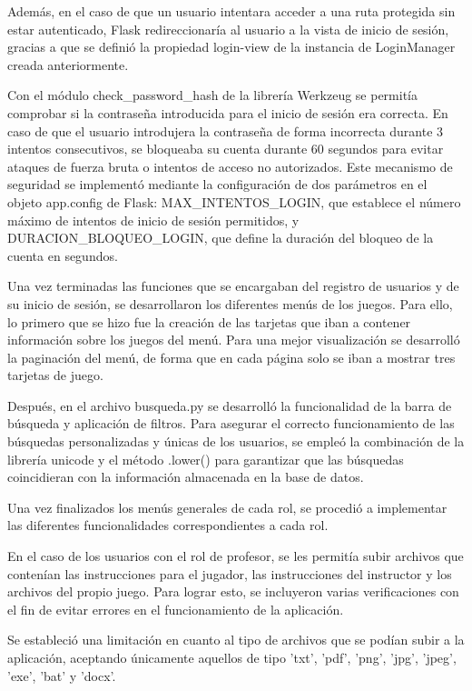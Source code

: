 Además, en el caso de que un usuario intentara acceder a una ruta protegida sin estar autenticado, Flask redireccionaría al usuario a la vista de inicio de sesión, gracias a que se definió la propiedad login-view de la instancia de LoginManager creada anteriormente. 


Con el módulo check\_password\_hash de la librería Werkzeug se permitía comprobar si la contraseña introducida para el inicio de sesión era correcta. En caso de que el usuario introdujera la contraseña de forma incorrecta durante 3 intentos consecutivos, se bloqueaba su cuenta durante 60 segundos para evitar ataques de fuerza bruta o intentos de acceso no autorizados. Este mecanismo de seguridad se implementó mediante la configuración de dos parámetros en el objeto app.config de Flask: MAX\_INTENTOS\_LOGIN, que establece el número máximo de intentos de inicio de sesión permitidos, y DURACION\_BLOQUEO\_LOGIN, que define la duración del bloqueo de la cuenta en segundos.

Una vez terminadas las funciones que se encargaban del registro de usuarios y de su inicio de sesión, se desarrollaron los diferentes menús de los juegos. Para ello, lo primero que se hizo fue la creación de las tarjetas que iban a contener información sobre los juegos del menú. Para una mejor visualización se desarrolló la paginación del menú, de forma que en cada página solo se iban a mostrar tres tarjetas de juego.

Después, en el archivo busqueda.py se desarrolló la funcionalidad de la barra de búsqueda y aplicación de filtros. Para asegurar el correcto funcionamiento de las búsquedas personalizadas y únicas de los usuarios, se empleó la combinación de la librería unicode y el método .lower() para garantizar que las búsquedas coincidieran con la información almacenada en la base de datos.

Una vez finalizados los menús generales de cada rol, se procedió a implementar las diferentes funcionalidades correspondientes a cada rol.

En el caso de los usuarios con el rol de profesor, se les permitía subir archivos que contenían las instrucciones para el jugador, las instrucciones del instructor y los archivos del propio juego. Para lograr esto, se incluyeron varias verificaciones con el fin de evitar errores en el funcionamiento de la aplicación.

Se estableció una limitación en cuanto al tipo de archivos que se podían subir a la aplicación, aceptando únicamente aquellos de tipo 'txt', 'pdf', 'png', 'jpg', 'jpeg', 'exe', 'bat' y 'docx'.

